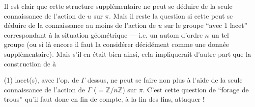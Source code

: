 Il est clair que cette structure supplémentaire ne peut se déduire
de la seule connaissance de l'action de \(u\) sur \(\pi\).
Mais il reste la question si cette 
peut se déduire de la connaissance au moins de l'action
 de \(u\) sur le groupe
``avec \(1\) lacet'' correspondant à la situation géométrique
--- i.e. un autom 
 d'ordre \(n\)  un tel groupe
(ou si là encore il faut la considérer décidément comme une donnée
supplémentaire).
Mais s'il en était bien ainsi, cela impliquerait d'autre part que la
construction de  à


(1) lacet(s), avec l'op. de \(\Gamma\) dessus, ne peut se faire non
plus à l'aide de la seule 
connaissance de l'action de \(\Gamma\) (\(=\mathbb Z/n\mathbb Z\))
sur \(\pi\).
C'est cette question de ``forage de trous'' qu'il faut donc en fin de
compte, à la fin des fins, attaquer !

